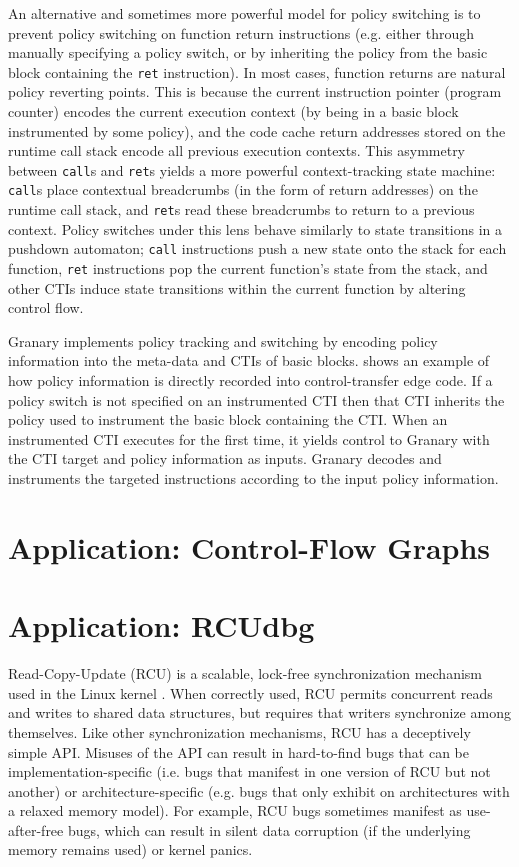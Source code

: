 \documentclass[preprint]{sigplanconf}
\begin{document}
An alternative and sometimes more powerful model for policy switching is to prevent policy switching on function return instructions (e.g. either through manually specifying a policy switch, or by inheriting the policy from the basic block containing the \texttt{ret} instruction). In most cases, function returns are natural policy reverting points. This is because the current instruction pointer (program counter) encodes the current execution context (by being in a basic block instrumented by some policy), and the code cache return addresses stored on the runtime call stack encode all previous execution contexts. This asymmetry between \texttt{call}s and \texttt{ret}s yields a more powerful context-tracking state machine: \texttt{call}s place contextual breadcrumbs (in the form of return addresses) on the runtime call stack, and \texttt{ret}s read these breadcrumbs to return to a previous context. Policy switches under this lens behave similarly to state transitions in a pushdown automaton; \texttt{call} instructions push a new state onto the stack for each function, \texttt{ret} instructions pop the current function's state from the stack, and other CTIs induce state transitions within the current function by altering control flow.

Granary implements policy tracking and switching by encoding policy information into the meta-data and CTIs of basic blocks.  shows an example of how policy information is directly recorded into control-transfer edge code. If a policy switch is not specified on an instrumented CTI then that CTI inherits the policy used to instrument the basic block containing the CTI. When an instrumented CTI executes for the first time, it yields control to Granary with the CTI target and policy information as inputs. Granary decodes and instruments the targeted instructions according to the input policy information.


\section{Application: Control-Flow Graphs}\label{sec:cfg}

\section{Application: RCUdbg}\label{sec:rcudbg}

Read-Copy-Update (RCU) is a scalable, lock-free synchronization mechanism used in the Linux kernel \cite{RCU,RCUInLinux}. When correctly used, RCU permits concurrent reads and writes to shared data structures, but requires that writers synchronize among themselves. Like other synchronization mechanisms, RCU has a deceptively simple API. Misuses of the API can result in hard-to-find bugs that can be implementation-specific (i.e. bugs that manifest in one version of RCU but not another) or architecture-specific (e.g. bugs that only exhibit on architectures with a relaxed memory model). For example, RCU bugs sometimes manifest as use-after-free bugs, which can result in silent data corruption (if the underlying memory remains used) or kernel panics. 
\end{document}
